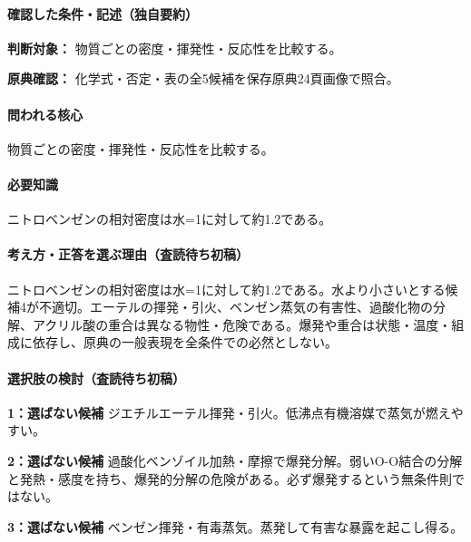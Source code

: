\paragraph{確認した条件・記述（独自要約）}\mbox{}\par

\noindent\textbf{判断対象：} 物質ごとの密度・揮発性・反応性を比較する。\par

\noindent\textbf{原典確認：} 化学式・否定・表の全5候補を保存原典24頁画像で照合。\par

\paragraph{問われる核心} 物質ごとの密度・揮発性・反応性を比較する。

\paragraph{必要知識} ニトロベンゼンの相対密度は水=1に対して約1.2である。

\paragraph{考え方・正答を選ぶ理由（査読待ち初稿）} ニトロベンゼンの相対密度は水=1に対して約1.2である。水より小さいとする候補4が不適切。エーテルの揮発・引火、ベンゼン蒸気の有害性、過酸化物の分解、アクリル酸の重合は異なる物性・危険である。爆発や重合は状態・温度・組成に依存し、原典の一般表現を全条件での必然としない。

\paragraph{選択肢の検討（査読待ち初稿）}\mbox{}\par

\noindent\textbf{1：選ばない候補} ジエチルエーテル揮発・引火。低沸点有機溶媒で蒸気が燃えやすい。\par

\noindent\textbf{2：選ばない候補} 過酸化ベンゾイル加熱・摩擦で爆発分解。弱いO-O結合の分解と発熱・感度を持ち、爆発的分解の危険がある。必ず爆発するという無条件則ではない。\par

\noindent\textbf{3：選ばない候補} ベンゼン揮発・有毒蒸気。蒸発して有害な暴露を起こし得る。\par

